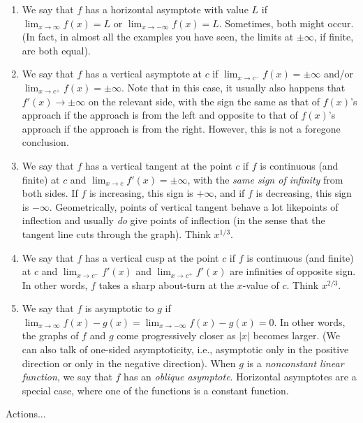 \documentclass[10pt]{amsart}
\begin{document}
\begin{enumerate}

\item We say that $f$ has a horizontal asymptote with value $L$ if
  $\lim_{x \to \infty} f(x) = L$ or $\lim_{x \to -\infty} f(x) =
  L$. Sometimes, both might occur. (In fact, in almost all the
  examples you have seen, the limits at $\pm \infty$, if finite, are
  both equal).
\item We say that $f$ has a vertical asymptote at $c$ if $\lim_{x \to
  c^-} f(x) = \pm \infty$ and/or $\lim_{x \to c^+} f(x) = \pm
  \infty$. Note that in this case, it usually also happens that $f'(x)
  \to \pm \infty$ on the relevant side, with the sign the same as that
  of $f(x)$'s approach if the approach is from the left and opposite
  to that of $f(x)$'s approach if the approach is from the
  right. However, this is not a foregone conclusion.
\item We say that $f$ has a vertical tangent at the point $c$ if $f$
  is continuous (and finite) at $c$ and $\lim_{x \to c} f'(x) = \pm
  \infty$, with the {\em same sign of infinity} from both sides. If
  $f$ is increasing, this sign is $+\infty$, and if $f$ is decreasing,
  this sign is $-\infty$. Geometrically, points of vertical tangent
  behave a lot likepoints of inflection and usually {\em do} give
  points of inflection (in the sense that the tangent line cuts
  through the graph). Think $x^{1/3}$.
\item We say that $f$ has a vertical cusp at the point $c$ if $f$ is
  continuous (and finite) at $c$ and $\lim_{x \to c^-} f'(x)$ and
  $\lim_{x \to c^+} f'(x)$ are infinities of opposite sign. In other
  words, $f$ takes a sharp about-turn at the $x$-value of $c$. Think
  $x^{2/3}$.
\item We say that $f$ is asymptotic to $g$ if $\lim_{x \to \infty}
  f(x) - g(x) = \lim_{x \to -\infty} f(x) - g(x) = 0$. In other words,
  the graphs of $f$ and $g$ come progressively closer as $|x|$ becomes
  larger. (We can also talk of one-sided asymptoticity, i.e.,
  asymptotic only in the positive direction or only in the negative
  direction). When $g$ is a {\em nonconstant linear function}, we say
  that $f$ has an {\em oblique asymptote}. Horizontal asymptotes are a
  special case, where one of the functions is a constant function.
\end{enumerate}

Actions...
\end{document}
